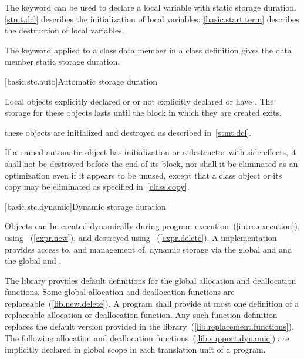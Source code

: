 \pnum
{}%
The keyword  can be used to declare a local variable with
static storage duration. \enternote \ref{stmt.dcl} describes the
initialization of local  variables; \ref{basic.start.term}
describes the destruction of local  variables. \exitnote

\pnum
{}%
The keyword  applied to a class data member in a class
definition gives the data member static storage duration.

[basic.stc.auto]{Automatic storage duration}

\pnum
{}%
%
%
%
Local objects explicitly declared  or  or
not explicitly declared  or  have
. The storage
for these objects lasts until the block in which they are created exits.

\pnum
\enternote 
these objects are initialized and destroyed as described in~\ref{stmt.dcl}.
\exitnote 

\pnum
If a named automatic object has initialization or a destructor with side
effects, it shall not be destroyed before the end of its block, nor
shall it be eliminated as an optimization even if it appears to be
unused, except that a class object or its copy may be eliminated as
specified in~\ref{class.copy}.

[basic.stc.dynamic]{Dynamic storage duration}%

\pnum
Objects can be created dynamically during program
execution~(\ref{intro.execution}), using
%
~(\ref{expr.new}), and destroyed using
%
~(\ref{expr.delete}). A \Cpp implementation
provides access to, and management of, dynamic storage via the global
  and  and the global   and .

\pnum
The library provides default definitions for the global allocation and
deallocation functions. Some global allocation and deallocation
functions are replaceable~(\ref{lib.new.delete}). A \Cpp program shall
provide at most one definition of a replaceable allocation or
deallocation function. Any such function definition replaces the default
version provided in the library~(\ref{lib.replacement.functions}). The
following allocation and deallocation functions~(\ref{lib.support.dynamic})
are implicitly declared in global scope in each translation unit of a
program.


